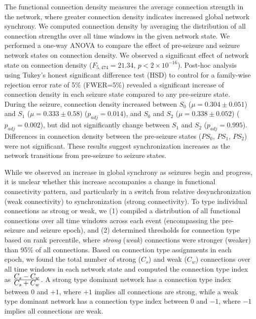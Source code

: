 The functional connection density measures the average connection strength in the network, where greater connection density indicates increased global network synchrony. We computed connection density by averaging the distribution of all connection strengths over all time windows in the given network state. We performed a one-way ANOVA to compare the effect of pre-seizure and seizure network states on connection density. We observed a significant effect of network state on connection density ($F_{5,474}=21.34$, $p<2\times10^{-16}$). Post-hoc analysis using Tukey's honest significant difference test (HSD) to control for a family-wise rejection error rate of 5\% (FWER=5\%) revealed a significant increase of connection density in each seizure state compared to any pre-seizure state. During the seizure, connection density increased between $S_0$ ($\mu=0.304\pm0.051$) and $S_1$ ($\mu=0.333\pm0.58$) ($p_{adj}=0.014$), and $S_0$ and $S_2$ ($\mu=0.338\pm0.052$) ($p_{adj}=0.002$), but did not significantly change between $S_1$ and $S_2$ ($p_{adj}=0.995$). Differences in connection density between the pre-seizure states ($PS_0$, $PS_1$, $PS_2$) were not significant. These results suggest synchronization increases as the network transitions from pre-seizure to seizure states. 

    While we observed an increase in global synchrony as seizures begin and progress, it is unclear whether this increase accompanies a change in functional connectivity pattern, and particularly in a switch from relative desynchronization (weak connectivity) to synchronization (strong connectivity). To type individual connections as strong or weak, we (1) compiled a distribution of all functional connections over all time windows across each event (encompassing the pre-seizure and seizure epoch), and (2) determined thresholds for connection type based on rank percentile, where \textit{strong} (\textit{weak}) connections were stronger (weaker) than 95\% of all connections. Based on connection type assignments in each epoch, we found the total number of strong ($C_s$) and weak ($C_w$) connections over all time windows in each network state and computed the connection type index as $\frac{\displaystyle C_s-C_w}{\displaystyle C_s+C_w}$. A strong type dominant network has a connection type index between $0$ and $+1$, where $+1$ implies all connections are strong, while a weak type dominant network has a connection type index between $0$ and $-1$, where $-1$ implies all connections are weak.

